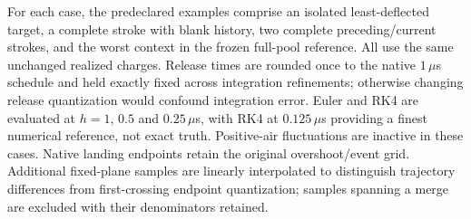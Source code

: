 For each case, the predeclared examples comprise an isolated least-deflected target, a complete stroke with blank history, two complete preceding/current strokes, and the worst context in the frozen full-pool reference. All use the same unchanged realized charges. Release times are rounded once to the native $1\,\mu$s schedule and held exactly fixed across integration refinements; otherwise changing release quantization would confound integration error. Euler and RK4 are evaluated at $h=1$, $0.5$ and $0.25\,\mu$s, with RK4 at $0.125\,\mu$s providing a finest numerical reference, not exact truth. Positive-air fluctuations are inactive in these cases. Native landing endpoints retain the original overshoot/event grid. Additional fixed-plane samples are linearly interpolated to distinguish trajectory differences from first-crossing endpoint quantization; samples spanning a merge are excluded with their denominators retained.

